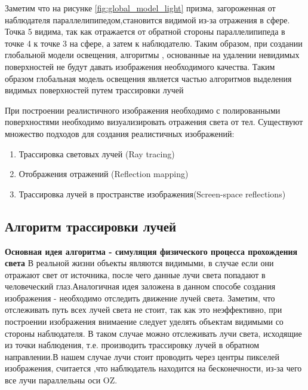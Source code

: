 \documentclass[a4paper,14pt, unknownkeysallowed]{extreport}
\begin{document}
Заметим что на рисунке \ref{fig:global_model_light}  призма, загороженная от наблюдателя параллелипипедом,становится видимой из-за отражения в сфере.
Точка 5 видима, так как отражается от обратной стороны параллелипипеда в точке 4 к точке 3 на сфере, а затем к наблюдателю.
Таким образом, при создании глобальной модели освещения, алгоритмы , основанные на удалении невидимых поверхностей не будут давать изображения необходимого качества.
Таким образом глобальная модель освещения является частью алгоритмов выделения видимых поверхностей путем трассировки лучей\cite{Rodgers}


При построении реалистичного изображения необходимо с полированными поверхностями необходимо визуализировать отражения света от тел.
Существуют множество подходов для создания реалистичных изображений:
\begin{enumerate}
	\item Трассировка световых лучей (Ray tracing)
	\item Отображения отражений (Reflection mapping)
	\item Трассировка лучей в пространстве изображения(Screen-space reflections)
\end{enumerate}





\subsection{Алгоритм трассировки лучей}
\label{sec:ray_tracing}
\textbf{Основная идея алгоритма - симуляция физического процесса прохождения света} \newline
В реальной жизни объекты являются видимыми, в случае если они отражают свет от источника, после чего данные лучи света попадают в человеческий глаз.Аналогичная идея заложена в данном способе создания изображения - необходимо отследить движение лучей света.
Заметим, что отслеживать путь всех лучей света не стоит, так как это неэффективно, при построении изображения внимаение следует уделять объектам видимыми со стороны наблюдателя.
В таком случае можно отслеживать лучи света, исходящие из точки наблюдения, т.е. производить трассировку лучей в обратном направлении.В нашем случае лучи стоит проводить через центры пикселей изображения,
считается ,что наблюдатель находится на бесконечности, из-за чего все лучи параллельны оси OZ.\cite{Rodgers,modern_ray_tracing}
\end{document}
